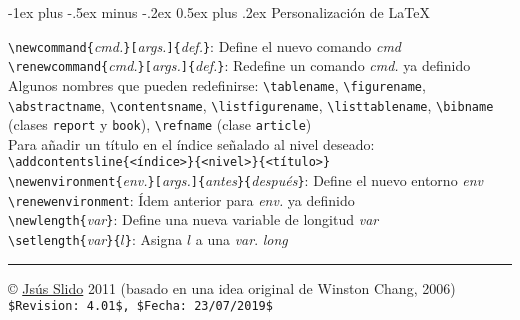 \documentclass[10pt,landscape,a4paper]{article}
\makeatletter
\renewcommand{\section}{\@startsection{section}{1}{0mm}%
                                {-1ex plus -.5ex minus -.2ex}%
                                {0.5ex plus .2ex}%
                                {\normalfont\large\bfseries}}
\makeatother
\begin{document}
\begin{multicols}{3}
\section{Personalización de \LaTeX}

\verb!\newcommand{!\emph{cmd.}\verb!}[!\emph{args.}\verb!]{!\emph{def.}\verb!}!: Define el nuevo comando \emph{cmd}\\
\verb!\renewcommand{!\emph{cmd.}\verb!}[!\emph{args.}\verb!]{!\emph{def.}\verb!}!: Redefine un comando \emph{cmd.} ya definido\\[0.7mm]

 Algunos nombres que pueden redefinirse: \verb!\tablename!, \verb!\figurename!, \verb!\abstractname!, \verb!\contentsname!, \verb!\listfigurename!, \verb!\listtablename!, \verb!\bibname! (clases \texttt{report} y \texttt{book}), \verb!\refname! (clase \texttt{article})\\
 Para añadir un título en el índice señalado al nivel deseado:\\
\verb|\addcontentsline{<índice>}{<nivel>}{<título>}|\\[0.7mm]
 
\verb!\newenvironment{!\emph{env.}\verb!}[!\emph{args.}\verb!]{!\emph{antes}\verb!}{!\emph{después}\verb!}!: Define el nuevo entorno \emph{env}\\
\verb!\renewenvironment!: Ídem anterior para \emph{env.} ya definido\\
\verb!\newlength{!\emph{var}\verb!}!: Define una nueva variable de longitud \emph{var}\\
\verb!\setlength{!\emph{var}\verb!}{!$l$\verb!}!: Asigna $l$ a una \emph{var}. \emph{long} \\[0.7mm]
 

\rule{0.3\linewidth}{0.25pt}
\scriptsize

\copyright{}  \href{https://www.uclm.es/profesorado/jsalido}{Jsús Slido} 2011 (basado en una idea original de Winston Chang, 2006)\\
\verb!$Revision: 4.01$, $Fecha: 23/07/2019$!

\end{multicols}
\end{document}
